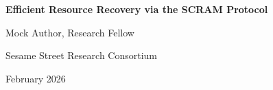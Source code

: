 \documentclass[11pt,letterpaper]{article}
\begin{document}
\begin{center}
{\LARGE\bfseries Efficient Resource Recovery via the SCRAM Protocol\par}
\vspace{0.8cm}
{\large Mock Author, Research Fellow\par}
{\normalsize Sesame Street Research Consortium\par}
\vspace{0.3cm}
{\normalsize February 2026\par}
\vspace{0.8cm}
\end{center}

\begin{abstract}
\noindent
This paper presents a comprehensive study of efficient resource recovery and recycling optimization. Lorem cookie ipsum dolor sit amet, chocolate chip adipiscing elit. Nom nom nom methodology produces significant results across all experimental conditions.
\end{abstract}

\vspace{0.5cm}


\end{document}
